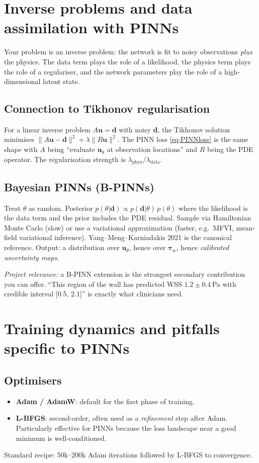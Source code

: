\documentclass[11pt]{article}
\begin{document}
\section{Inverse problems and data assimilation with PINNs}

Your problem is an inverse problem: the network is fit to noisy observations \emph{plus} the physics. The data term plays the role of a likelihood, the physics term plays the role of a regulariser, and the network parameters play the role of a high-dimensional latent state.

\subsection*{Connection to Tikhonov regularisation}
For a linear inverse problem $A\mathbf{u} = \mathbf{d}$ with noisy $\mathbf{d}$, the Tikhonov solution minimises $\|A\mathbf{u} - \mathbf{d}\|^2 + \lambda\|R\mathbf{u}\|^2$. The PINN loss \eqref{eq:PINNloss} is the same shape with $A$ being ``evaluate $\mathbf{u}_\theta$ at observation locations'' and $R$ being the PDE operator. The regularisation strength is $\lambda_{\text{phys}}/\lambda_{\text{data}}$.

\subsection*{Bayesian PINNs (B-PINNs)}
Treat $\theta$ as random. Posterior $p(\theta | \mathbf{d}) \propto p(\mathbf{d}|\theta)\,p(\theta)$ where the likelihood is the data term and the prior includes the PDE residual. Sample via Hamiltonian Monte Carlo (slow) or use a variational approximation (faster, e.g.\ MFVI, mean-field variational inference). Yang--Meng--Karniadakis 2021 is the canonical reference. Output: a distribution over $\mathbf{u}_\theta$, hence over $\boldsymbol{\tau}_w$, hence \emph{calibrated uncertainty maps}.

\textit{Project relevance:} a B-PINN extension is the strongest secondary contribution you can offer. ``This region of the wall has predicted WSS $1.2 \pm 0.4$\,Pa with credible interval [0.5, 2.1]'' is exactly what clinicians need.

\section{Training dynamics and pitfalls specific to PINNs}

\subsection*{Optimisers}
\begin{itemize}[noitemsep]
\item \textbf{Adam / AdamW}: default for the first phase of training.
\item \textbf{L-BFGS}: second-order, often used as a \emph{refinement} step after Adam. Particularly effective for PINNs because the loss landscape near a good minimum is well-conditioned.
\end{itemize}
Standard recipe: 50k--200k Adam iterations followed by L-BFGS to convergence.
\end{document}
